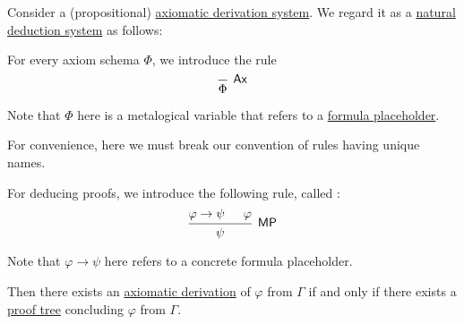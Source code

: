 \begin{proposition}\label{thm:axiomatic_derivation_as_natural_deduction}
  Consider a (propositional) \hyperref[def:axiomatic_derivation_system]{axiomatic derivation system}. We regard it as a \hyperref[def:natural_deduction_system]{natural deduction system} as follows:
  \begin{thmenum}
     For every axiom schema \( \Phi \), we introduce the rule
    \begin{equation*}
      \begin{prooftree}
        \infer0[\logic{Ax}]{ \Phi }
      \end{prooftree}
    \end{equation*}

    Note that \( \Phi \) here is a metalogical variable that refers to a \hyperref[def:propositional_formula_placeholder]{formula placeholder}.

    For convenience, here we must break our convention of rules having unique names.

     For deducing proofs, we introduce the following rule, called :
    \begin{equation*}
      \begin{prooftree}
        \hypo{ \varphi \rightarrow \psi }
        \hypo{ \varphi }
        \infer2[\logic{MP}]{ \psi }
      \end{prooftree}
    \end{equation*}

    Note that \( \varphi \rightarrow \psi \) here refers to a concrete formula placeholder.
  \end{thmenum}

  Then there exists an \hyperref[def:axiomatic_derivation]{axiomatic derivation} of \( \varphi \) from \( \Gamma \) if and only if there exists a \hyperref[def:natural_deduction_proof_tree]{proof tree} concluding \( \varphi \) from \( \Gamma \).
\end{proposition}

